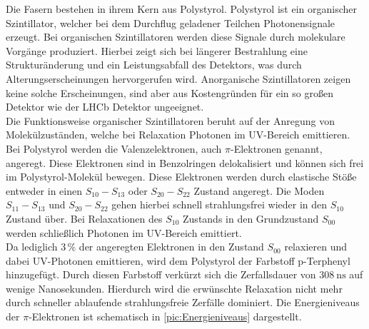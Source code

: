 Die Fasern bestehen in ihrem Kern aus Polystyrol. Polystyrol ist ein organischer Szintillator, welcher bei dem 
Durchflug geladener Teilchen Photonensignale erzeugt. Bei organischen Szintillatoren werden diese Signale durch
molekulare Vorgänge produziert. Hierbei zeigt sich bei längerer Bestrahlung eine Strukturänderung und ein Leistungsabfall des
Detektors, was durch Alterungserscheinungen hervorgerufen wird. Anorganische Szintillatoren zeigen keine solche Erscheinungen,
sind aber aus Kostengründen für ein so großen Detektor wie der LHCb Detektor ungeeignet.\\
Die Funktionsweise organischer Szintillatoren beruht auf der Anregung von Molekülzuständen, welche bei Relaxation
Photonen im UV-Bereich emittieren. Bei Polystyrol werden die Valenzelektronen, auch $\pi$-Elektronen genannt, angeregt.
Diese Elektronen sind in Benzolringen delokalisiert und können sich frei im Polystyrol-Molekül bewegen. Diese Elektronen
werden durch elastische Stöße entweder in einen $S_{10} - S_{13}$ oder $S_{20} - S_{22}$ Zustand angeregt. Die Moden $S_{11} - S_{13}$ und $S_{20} - S_{22}$
gehen hierbei schnell strahlungsfrei wieder in den $S_{10}$ Zustand über. Bei Relaxationen des $S_{10}$ Zustands in den 
Grundzustand $S_{00}$ werden schließlich Photonen im UV-Bereich emittiert.\\
Da lediglich $3 \, \%$ der angeregten Elektronen in den Zustand $S_{00}$ relaxieren und dabei UV-Photonen
emittieren, wird dem Polystyrol der Farbstoff p-Terphenyl hinzugefügt. Durch diesen Farbstoff verkürzt sich die Zerfallsdauer
von $\qty{308}{\nano\second}$ auf wenige Nanosekunden. Hierdurch wird die erwünschte Relaxation nicht mehr durch 
schneller ablaufende strahlungsfreie Zerfälle dominiert. Die Energieniveaus der $\pi$-Elektronen ist schematisch in 
\autoref{pic:Energieniveaus} dargestellt.

